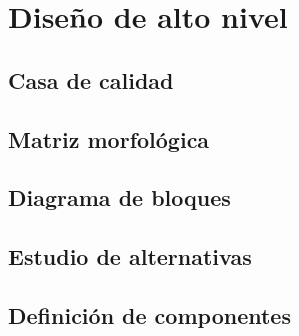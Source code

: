 
\chapter{Diseño de alto nivel}
\label{cap:diseno_alto_nivel}


\section{Casa de calidad}
\label{sec:casa_calidad}


\section{Matriz morfológica}
\label{sec:matriz_morfologica}


\section{Diagrama de bloques}
\label{sec:diagrama_bloques}


\section{Estudio de alternativas}
\label{sec:alternativas}


\section{Definición de componentes}
\label{sec:componentes}

